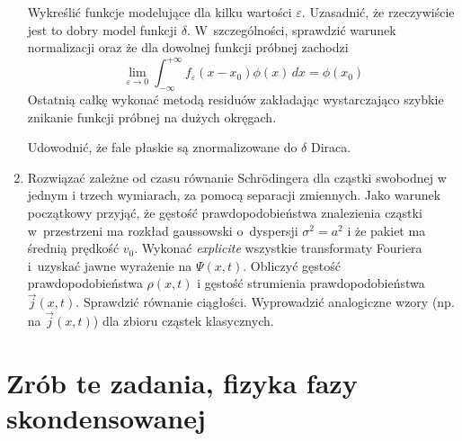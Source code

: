 \documentclass[a4paper,11pt]{article}
\begin{document}
\begin{enumerate}
  Wykreślić funkcje modelujące dla kilku wartości $\varepsilon$. Uzasadnić, że
  rzeczywiście jest to dobry model funkcji $\delta$. W~szczególności,
  sprawdzić warunek normalizacji oraz że dla dowolnej funkcji próbnej
  zachodzi
  \begin{equation}
    \label{eq:5}
    \lim_{ \varepsilon \to 0} \int_{ -\infty }^{ +\infty } f_{ \varepsilon }( x - x_{ 0 } ) \phi( x ) \, dx
    =
    \phi( x_{ 0 } )
  \end{equation}
  Ostatnią całkę wykonać metodą residuów zakładając wystarczająco
  szybkie znikanie funkcji próbnej na dużych okręgach.

  Udowodnić, że fale płaskie są znormalizowane do $\delta$ Diraca.

\item Rozwiązać zależne od czasu równanie Schr\"{o}dingera dla cząstki
  swobodnej w jednym i trzech wymiarach, za pomocą separacji
  zmiennych. Jako warunek początkowy przyjąć, że gęstość
  prawdopodobieństwa znalezienia cząstki w~przestrzeni ma rozkład
  gaussowski o~dyspersji $\sigma^{ 2 } = a^{ 2 }$ i że pakiet ma
  średnią prędkość $v_{ 0 }$. Wykonać \emph{explicite} wszystkie
  transformaty Fouriera i~uzyskać jawne wyrażenie na $\Psi( x, t )$.
  Obliczyć gęstość prawdopodobieństwa $\rho( x, t )$ i gęstość
  strumienia prawdopodobieństwa $\vec{ j }( x, t )$. Sprawdzić
  równanie ciągłości. Wyprowadzić analogiczne wzory (np. na
  $\vec{ j }( x, t )$) dla zbioru cząstek klasycznych.

\end{enumerate}










\section{Zrób te zadania, fizyka fazy skondensowanej}


\end{document}
